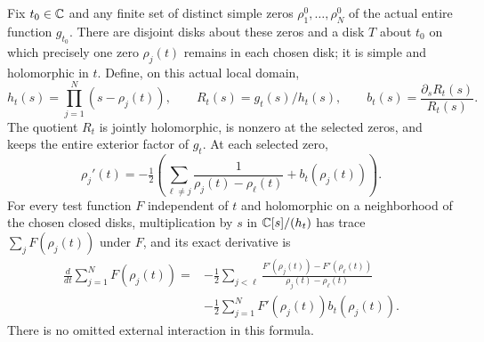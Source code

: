 \begin{hdttheorem}\label{hdt:thm:moving}
Fix $t_0\in\mathbb C$ and any finite set of distinct simple zeros
$\rho_1^0,\ldots,\rho_N^0$ of the actual entire function $g_{t_0}$.
There are disjoint disks about these zeros and a disk $T$ about
$t_0$ on which precisely one zero $\rho_j(t)$ remains in each
chosen disk; it is simple and holomorphic in $t$.
Define, on this actual local domain,
\begin{equation}\label{hdt:eq:moving-factor}
h_t(s)=\prod_{j=1}^N(s-\rho_j(t)),\qquad
R_t(s)=g_t(s)/h_t(s),\qquad b_t(s)=\frac{\partial_sR_t(s)}{R_t(s)}.
\end{equation}
The quotient $R_t$ is jointly holomorphic, is nonzero at the
selected zeros, and keeps the entire exterior factor of $g_t$.
At each selected zero,
\begin{equation}\label{hdt:eq:velocity}
\rho_j'(t)=-\tfrac12\left(
\sum_{\ell\ne j}\frac1{\rho_j(t)-\rho_\ell(t)}
+b_t(\rho_j(t))\right).
\end{equation}
For every test function $F$ independent of $t$ and holomorphic on
a neighborhood of the chosen closed disks, multiplication
by $s$ in $\mathbb C[s]/(h_t)$ has trace $\sum_jF(\rho_j(t))$ under $F$,
and its exact derivative is
\begin{equation}\label{hdt:eq:moving-trace}
\begin{split}
\frac d{dt}\sum_{j=1}^NF(\rho_j(t))
={}&-\frac12\sum_{j<\ell}
\frac{F'(\rho_j(t))-F'(\rho_\ell(t))}
{\rho_j(t)-\rho_\ell(t)}\\
&-\frac12\sum_{j=1}^NF'(\rho_j(t))b_t(\rho_j(t)).
\end{split}
\end{equation}
There is no omitted external interaction in this formula.
\end{hdttheorem}
